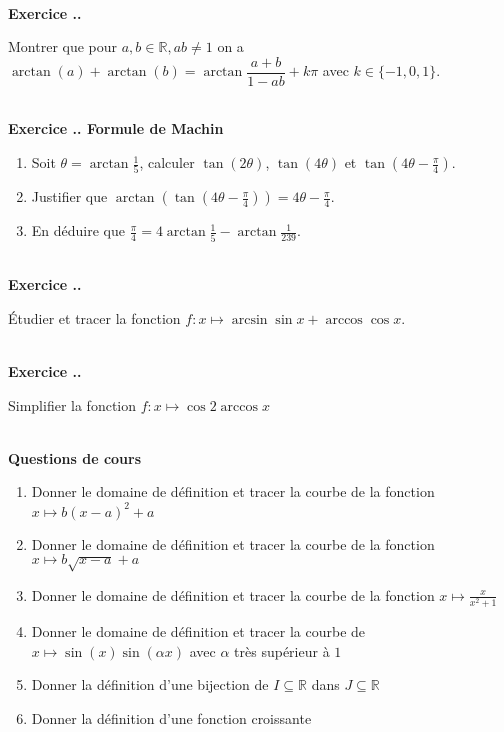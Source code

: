 \documentclass{article}
\newcommand{\ds}{\vspace{0.4\baselineskip}}
\newcommand{\mb}[1]{\mathbb{#1}}
\newcounter{exo}
\newcommand{\exercice}[1][\null]{\textbf{\\ Exercice \thesection.\theexo. #1} \addtocounter{exo}{1}}
\newcommand{\cours}{\textbf{\ds \\ \large Questions de cours}}
\begin{document}
\exercice

Montrer que pour $a,b \in \mb{R}, ab \neq 1$ on a $\arctan(a) + \arctan(b) = \arctan \dfrac{a+b}{1-ab} + k \pi$ avec $k \in \{ -1, 0, 1 \}$.


\exercice[Formule de Machin]

\begin{enumerate} 

\item Soit $\theta = \arctan \frac{1}{5}$, calculer $\tan(2\theta)$, $\tan(4 \theta)$ et $\tan(4 \theta - \frac{\pi}{4})$.

\item Justifier que $\arctan(\tan(4 \theta-\frac{\pi}{4})) = 4 \theta-\frac{\pi}{4}$.

\item En déduire que $\displaystyle \frac{\pi}{4} = 4 \arctan\frac{1}{5} -  \arctan\frac{1}{239}$.

\end{enumerate}

\exercice 

Étudier et tracer la fonction $f : x \mapsto \arcsin \sin x + \arccos \cos x$.

\exercice 

Simplifier la fonction $f : x \mapsto \cos 2 \arccos x$




\cours 

\begin{enumerate}
    \item Donner le domaine de définition et tracer 
        la courbe de la fonction $x \mapsto b (x - a)^2 + a$

    \item Donner le domaine de définition et tracer 
        la courbe de la fonction $x \mapsto b \sqrt{x - a} + a$

    \item Donner le domaine de définition et tracer 
        la courbe de la fonction $x \mapsto \frac{x}{x^2 + 1}$


    \item Donner le domaine de définition et tracer la courbe 
        de $x \mapsto \sin(x) \sin (\alpha x)$ avec $\alpha$ très
        supérieur à $1$

    \item Donner la définition d'une bijection de $I \subseteq \mb{R}$
        dans $J \subseteq \mb{R}$

    \item Donner la définition d'une fonction croissante 
\end{enumerate}
\end{document}
